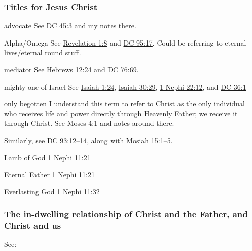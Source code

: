 	\subsubsection{Titles for Jesus Christ}
		\label{CHRIST-titles}
	
		\begin{compactdesc}
			\item[advocate] See \hyperref[DC45-3]{DC 45:3} and my notes there.
			\item[Alpha/Omega] See \hyperref[REVELATIONNT-1-8]{Revelation 1:8} and \hyperref[DC95-17]{DC 95:17}. Could be referring to eternal lives/\hyperref[ROUND-PHRASES]{eternal round} stuff.
			\item[mediator] See \hyperref[HEBREWS-12-24]{Hebrews 12:24} and \hyperref[DC76-69]{DC 76:69}.
			\item[mighty one of Israel] See \hyperref[ISAIAH-1-24]{Isaiah 1:24}, \hyperref[ISAIAH-30-29]{Isaiah 30:29}, \hyperref[1NEPHI-22-12]{1 Nephi 22:12}, and \hyperref[DC36-1]{DC 36:1}
			\item[only begotten] I understand this term to refer to Christ as the only individual who receives life and power directly through Heavenly Father; we receive it through Christ. See \hyperref[MOSES-4-1]{Moses 4:1} and notes around there.
				\begin{compactitem}
					\item Similarly, see \hyperref[DC93-12]{DC 93:12--14}, along with \hyperref[MOSIAH-15-1]{Mosiah 15:1--5}.
				\end{compactitem}
			\item[Lamb of God] \hyperref[1NEPHI-11-21]{1 Nephi 11:21}
			\item[Eternal Father] \hyperref[1NEPHI-11-21]{1 Nephi 11:21}
			\item[Everlasting God] \hyperref[1NEPHI-11-32]{1 Nephi 11:32}
		\end{compactdesc}
		
	\subsubsection{The in-dwelling relationship of Christ and the Father, and Christ and us}
		\label{CHRIST-indwelling}
		
		See:
		
